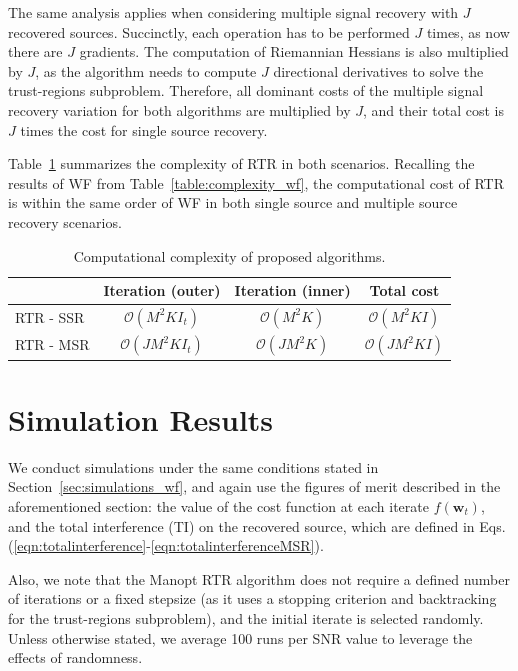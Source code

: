 The same analysis applies when considering multiple signal recovery with $J$ recovered sources. Succinctly, each operation has to be performed $J$ times, as now there are $J$ gradients. The computation of Riemannian Hessians is also multiplied by $J$, as the algorithm needs to compute $J$ directional derivatives to solve the trust-regions subproblem. Therefore, all dominant costs of the multiple signal recovery variation for both algorithms are multiplied by $J$, and their total cost is $J$ times the cost for single source recovery.

Table~\ref{table:complexity_rtr} summarizes the complexity of RTR in both scenarios. Recalling the results of WF from Table~\ref{table:complexity_wf}, the computational cost of RTR is within the same order of WF in both single source and multiple source recovery scenarios.
\begin{table}[H]
	\caption{Computational complexity of proposed algorithms.}\label{table:complexity_rtr}
	\centering
	\begin{tabular}{l|ccc}
		& Iteration (outer) & Iteration (inner) & Total cost\\\hline
		RTR - SSR&  $\mathcal{O}(M^2KI_t)$ & $\mathcal{O}(M^2K)$  & $\mathcal{O}(M^2KI)$  \\\hline
		RTR - MSR&  $\mathcal{O}(JM^2KI_t)$ & $\mathcal{O}(JM^2K)$  & $\mathcal{O}(JM^2KI)$  \\
	\end{tabular}
\end{table}



\section{Simulation Results} \label{sec:simulations_rtr}

We conduct simulations under the same conditions stated in Section~\ref{sec:simulations_wf}, and again use the figures of merit described in the aforementioned section: the value of the cost function at each iterate $f(\bm{w}_t)$, and the total interference (TI) on the recovered source, which are defined in Eqs.(\ref{eqn:totalinterference}-\ref{eqn:totalinterferenceMSR}).

Also, we note that the Manopt RTR algorithm does not require a defined number of iterations or a fixed stepsize (as it uses a stopping criterion and backtracking for the trust-regions subproblem), and the initial iterate is selected randomly. Unless otherwise stated, we average 100 runs per SNR value to leverage the effects of randomness.

